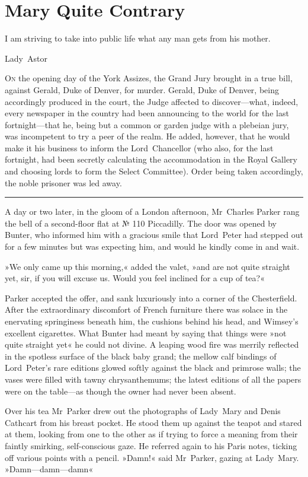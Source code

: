 \chapter{Mary Quite Contrary}

\epigraph{I am striving to take into public life what any man gets from his mother.}{Lady~Astor}


\lettrine[lines=4]{O}{n} the opening day of the York Assizes, the Grand Jury brought in a true bill, against Gerald, Duke of Denver, for murder. Gerald, Duke of Denver, being accordingly produced in the court, the Judge affected to discover—what, indeed, every newspaper in the country had been announcing to the world for the last fortnight—that he, being but a common or garden judge with a plebeian jury, was incompetent to try a peer of the realm. He added, however, that he would make it his business to inform the Lord~Chancellor (who also, for the last fortnight, had been secretly calculating the accommodation in the Royal Gallery and choosing lords to form the Select Committee). Order being taken accordingly, the noble prisoner was led away.


\noindent\hfil\rule{0.5\textwidth}{.4pt}\hfil


A day or two later, in the gloom of a London afternoon, Mr~Charles Parker rang the bell of a second-floor flat at № 110 Piccadilly. The door was opened by Bunter, who informed him with a gracious smile that Lord~Peter had stepped out for a few minutes but was expecting him, and would he kindly come in and wait.

»We only came up this morning,« added the valet, »and are not quite straight yet, sir, if you will excuse us. Would you feel inclined for a cup of tea?«

Parker accepted the offer, and sank luxuriously into a corner of the Chesterfield. After the extraordinary discomfort of French furniture there was solace in the enervating springiness beneath him, the cushions behind his head, and Wimsey's excellent cigarettes. What Bunter had meant by saying that things were »not quite straight yet« he could not divine. A leaping wood fire was merrily reflected in the spotless surface of the black baby grand; the mellow calf bindings of Lord~Peter's rare editions glowed softly against the black and primrose walls; the vases were filled with tawny chrysanthemums; the latest editions of all the papers were on the table—as though the owner had never been absent.

Over his tea Mr~Parker drew out the photographs of Lady~Mary and Denis Cathcart from his breast pocket. He stood them up against the teapot and stared at them, looking from one to the other as if trying to force a meaning from their faintly smirking, self-conscious gaze. He referred again to his Paris notes, ticking off various points with a pencil.  »Damn!« said Mr~Parker, gazing at Lady~Mary. »Damn—damn—damn\longdash«

